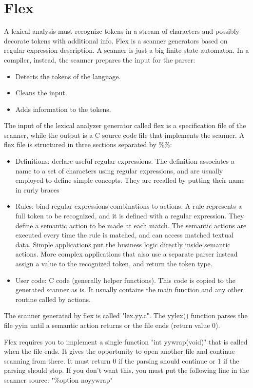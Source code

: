 \documentclass[12pt, a4paper]{report}
\begin{document}
    \section{Flex}
    A lexical analysis must recognize tokens in a stream of characters and possibly decorate tokens with additional info. Flex is a scanner generators based on regular 
    expression description. A scanner is just a big finite state automaton. In a compiler, instead, the scanner prepares the input for the parser:
    \begin{itemize}
        \item Detects the tokens of the language. 
        \item Cleans the input. 
        \item Adds information to the tokens. 
    \end{itemize}
    The input of the lexical analyzer generator called flex is a specification file of the scanner, while the output is a C source code file that implements the scanner. 
    A flex file is structured in three sections separated by $\%\%$:
    \begin{itemize}
        \item Definitions: declare useful regular expressions. The definition associates a name to a set of characters using regular expressions, and are usually employed 
            to define simple concepts. They are recalled by putting their name in curly braces
        \item Rules: bind regular expressions combinations to actions. A rule represents a full token to be recognized, and it is defined with a regular expression. They 
            define a semantic action to be made at each match. The semantic actions are executed every time the rule is matched, and can access matched textual data. 
            Simple applications put the business logic directly inside semantic actions. More complex applications that also use a separate parser instead assign a value 
            to the recognized token, and return the token type. 
        \item User code: C code (generally helper functions). This code is copied to the generated scanner as is. It usually contains the main function and any other 
            routine called by actions. 
    \end{itemize}
    The scanner generated by flex is called "lex.yy.c". The yylex() function parses the file yyin until a semantic action returns or the file ends (return value 0). 

    Flex requires you to implement a single function "int yywrap(void)" that is called when the file ends. It gives the opportunity to open another file and continue 
    scanning from there. It must return 0 if the parsing should continue or 1 if the parsing should stop. If you don’t want this, you must put the following line
    in the scanner source: "$\%$option noyywrap"
\end{document}
